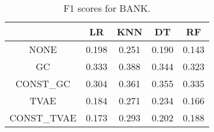 \begin{table}
\caption{F1 scores for BANK.}
\label{tab:f1-BANK}
\begin{tabular}{ccccc}
\toprule
 & LR & KNN & DT & RF \\
\midrule
NONE & 0.198 & 0.251 & 0.190 & 0.143 \\
GC & 0.333 & 0.388 & 0.344 & 0.323 \\
CONST\_GC & 0.304 & 0.361 & 0.355 & 0.335 \\
TVAE & 0.184 & 0.271 & 0.234 & 0.166 \\
CONST\_TVAE & 0.173 & 0.293 & 0.202 & 0.188 \\
\bottomrule
\end{tabular}
\end{table}
